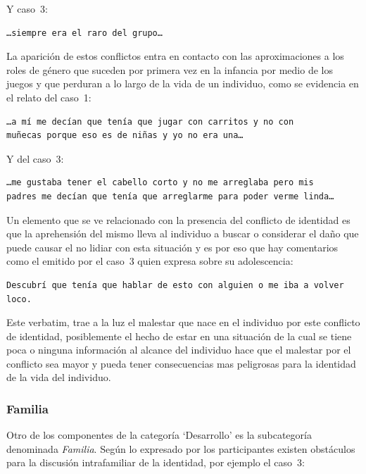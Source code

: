 Y caso~3:

\begin{verbatim}
…siempre era el raro del grupo…
\end{verbatim}

La aparición de estos conflictos entra en contacto con las aproximaciones a los
roles de género que suceden por primera vez en la infancia por medio de los
juegos y que perduran a lo largo de la vida de un individuo, como se evidencia
en el relato del caso~1:

\begin{verbatim}
…a mí me decían que tenía que jugar con carritos y no con
muñecas porque eso es de niñas y yo no era una…
\end{verbatim}

Y del caso~3:

\begin{verbatim}
…me gustaba tener el cabello corto y no me arreglaba pero mis
padres me decían que tenía que arreglarme para poder verme linda…
\end{verbatim}

 Un elemento que se ve relacionado con la presencia del conflicto de identidad
 es que la aprehensión del mismo lleva al individuo a buscar o considerar el
 daño que puede causar el no lidiar con esta situación y es por eso que hay
 comentarios como el emitido por el caso~3 quien expresa sobre su
 adolescencia:

 \begin{verbatim}
Descubrí que tenía que hablar de esto con alguien o me iba a volver loco.
 \end{verbatim}

 Este verbatim, trae a la luz el malestar que nace en el individuo por este
 conflicto de identidad, posiblemente el hecho de estar en una situación de la
 cual se tiene poca o ninguna información al alcance del individuo hace que el
 malestar por el conflicto sea mayor y pueda tener consecuencias mas peligrosas
 para la identidad de la vida del individuo.

\subsubsection{Familia}

Otro de los componentes de la categoría ‘Desarrollo’ es la subcategoría
denominada \emph{Familia}. Según lo expresado por los participantes existen obstáculos para la discusión intrafamiliar de la identidad, por ejemplo el
caso~3:

